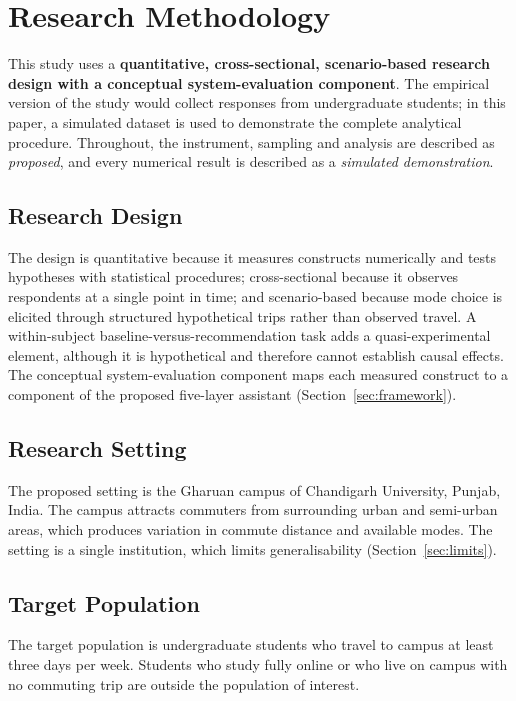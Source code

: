 \documentclass[11pt,a4paper]{article}
\begin{document}
\section{Research Methodology}
\label{sec:method}

This study uses a \textbf{quantitative, cross-sectional, scenario-based research design with a
conceptual system-evaluation component}. The empirical version of the study would collect responses
from undergraduate students; in this paper, a simulated dataset is used to demonstrate the complete
analytical procedure. Throughout, the instrument, sampling and analysis are described as
\emph{proposed}, and every numerical result is described as a \emph{simulated demonstration}.

\subsection{Research Design}
The design is quantitative because it measures constructs numerically and tests hypotheses with
statistical procedures; cross-sectional because it observes respondents at a single point in time;
and scenario-based because mode choice is elicited through structured hypothetical trips rather than
observed travel. A within-subject baseline-versus-recommendation task adds a quasi-experimental
element, although it is hypothetical and therefore cannot establish causal effects. The conceptual
system-evaluation component maps each measured construct to a component of the proposed five-layer
assistant (Section~\ref{sec:framework}).

\subsection{Research Setting}
The proposed setting is the Gharuan campus of Chandigarh University, Punjab, India. The campus
attracts commuters from surrounding urban and semi-urban areas, which produces variation in commute
distance and available modes. The setting is a single institution, which limits generalisability
(Section~\ref{sec:limits}).

\subsection{Target Population}
The target population is undergraduate students who travel to campus at least three days per week.
Students who study fully online or who live on campus with no commuting trip are outside the
population of interest.
\end{document}
